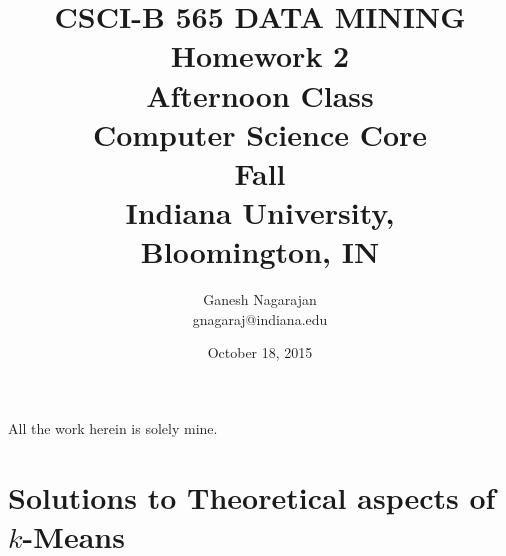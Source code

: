 \documentclass{article}
\begin{document}
\title{ CSCI-B 565  DATA MINING \\
Homework 2 \\ Afternoon Class\\ Computer Science Core \\ Fall \\Indiana University,\\ Bloomington, IN}
\author{ Ganesh Nagarajan \\ gnagaraj@indiana.edu}
\date{ October 18, 2015 }
\maketitle
All the work herein is solely mine.
\section{Solutions to Theoretical aspects of $k$-Means }
\pagestyle{plain}
\end{document}
